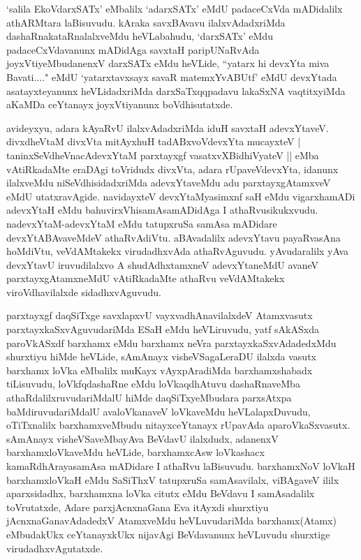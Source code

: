 \begin{artha}
`salila EkoVdarxSATx' eMbalilx `adarxSATx' eMdU padaceCxVda mADidalilx athARMtara laBisuvudu. kAraka savxBAvavu ilalxvAdadxriMda dashaRnakataRnalalxveMdu heVLabahudu, `darxSATx' eMdu padaceCxVdavanunx mADidAga savxtaH paripUNaRvAda joyxVtiyeMbudanenxV darxSATx eMdu heVLide, ``yatarx hi devxYta miva Bavati...." eMdU `yatarxtavxsayx savaR matemxYvABUtf' eMdU devxYtada asatayxteyanunx heVLidadxriMda darxSaTxqqpadavu lakaSxNA vaqtitxyiMda aKaMDa ceYtanayx joyxVtiyanunx boVdhisutatxde. 
\end{artha}

\begin{artha}
avideyxyu, adara kAyaRvU ilalxvAdadxriMda iduH savxtaH adevxYtaveV. divxdheVtaM divxVta mitAyxhuH tadABxvoVdevxYta mucayxteV |
taninxSeVdheVnacAdevxYtaM parxtayxgf vasatxvXBidhiVyateV || eMba vAtiRkadaMte eraDAgi toVridudx divxVta, adara rUpaveVdevxYta, idanunx ilalxveMdu niSeVdhisidadxriMda adevxYtaveMdu adu parxtayxgAtamxveV eMdU utatxravAgide. navidayxteV devxYtaMyasimxnf saH eMdu vigarxhamADi adevxYtaH eMdu bahuvirxVhisamAsamADidAga I athaRvusikukxvudu. nadevxYtaM-adevxYtaM eMdu tatupxruSa samAsa mADidare devxYtABAvaveMdeV athaRvAdiVtu. aBAvadalilx adevxYtavu payaRvasAna hoMdiVtu, veVdAMtakekx virudadhxvAda athaRvAguvudu. yAvudaralilx yAva devxYtavU iruvudilalxvo A shudAdhxtamxneV adevxYtaneMdU avaneV parxtayxgAtamxneMdU vAtiRkadaMte athaRvu veVdAMtakekx viroVdhavilalxde sidadhxvAguvudu. 
\end{artha}%


\begin{artha}
parxtayxgf daqSiTxge savxlapxvU vayxvadhAnavilalxdeV Atamxvasutx parxtayxkaSxvAguvudariMda ESaH eMdu heVLiruvudu, yatf sAkASxda paroVkASxdf barxhamx eMdu barxhamx neVra parxtayxkaSxvAdadedxMdu shurxtiyu hiMde heVLide, sAmAnayx visheVSagaLeraDU ilalxda vasutx barxhamx loVka eMbalilx muKayx vAyxpAradiMda barxhamxshabadx tiLisuvudu, loVkfqdashaRne eMdu loVkaqdhAtuvu dashaRnaveMba athaRdalilxruvudariMdalU hiMde daqSiTxyeMbudara parxsAtxpa baMdiruvudariMdalU avaloVkanaveV loVkaveMdu heVLalapxDuvudu, oTiTxnalilx barxhamxveMbudu nitayxceYtanayx rUpavAda aparoVkaSxvasutx. sAmAnayx visheVSaveMbayAva BeVdavU ilalxdudx, adanenxV barxhamxloVkaveMdu heVLide, barxhamxcAsw loVkashacx kamaRdhArayasamAsa mADidare I athaRvu laBisuvudu. barxhamxNoV loVkaH barxhamxloVkaH eMdu SaSiThxV tatupxruSa samAsavilalx, viBAgaveV ililx aparxsidadhx, barxhamxna loVka citutx eMdu BeVdavu I samAsadalilx toVrutatxde, Adare parxjAcnxnaGana Eva itAyxdi shurxtiyu jAcnxnaGanavAdadedxV AtamxveMdu heVLuvudariMda barxhamx(Atamx) eMbudakUkx ceYtanayxkUkx nijavAgi BeVdavanunx heVLuvudu shurxtige virudadhxvAgutatxde.
\end{artha}

